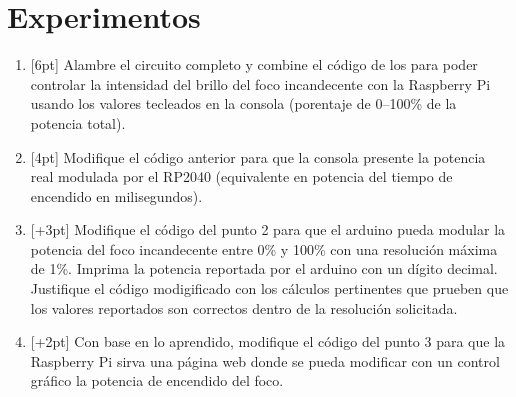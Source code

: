 %
%


\section{Experimentos}%
\label{sec:experiments}

\begin{enumerate}
	\item{} [6pt] Alambre el circuito completo y combine el código de los  para poder controlar la intensidad del brillo del foco incandecente con la Raspberry Pi usando los valores tecleados en la consola (porentaje de 0--100\% de la potencia total).

	\item{} [4pt] Modifique el código anterior para que la consola presente la potencia real modulada por el RP2040 (equivalente en potencia del tiempo de encendido en milisegundos).

	\item{} [+3pt] Modifique el código del punto 2 para que el arduino pueda modular la potencia del foco incandecente entre 0\% y 100\% con una resolución máxima de 1\%. Imprima la potencia reportada por el arduino con un dígito decimal.
	Justifique el código modigificado con los cálculos pertinentes que prueben que los valores reportados son correctos dentro de la resolución solicitada.

	\item{} [+2pt] Con base en lo aprendido, modifique el código del punto 3 para que la Raspberry Pi sirva una página web donde se pueda modificar con un control gráfico la potencia de encendido del foco.
\end{enumerate}
